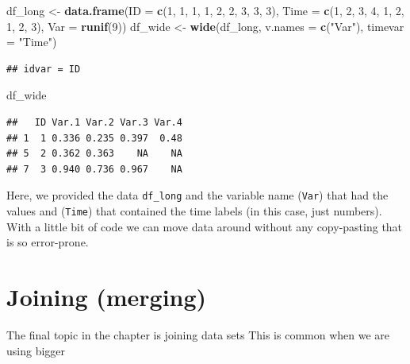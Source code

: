 \documentclass[]{tufte-book}
\newenvironment{Shaded}{}{}
\newcommand{\KeywordTok}[1]{\textcolor[rgb]{0.00,0.44,0.13}{\textbf{#1}}}
\newcommand{\DataTypeTok}[1]{\textcolor[rgb]{0.56,0.13,0.00}{#1}}
\newcommand{\DecValTok}[1]{\textcolor[rgb]{0.25,0.63,0.44}{#1}}
\newcommand{\StringTok}[1]{\textcolor[rgb]{0.25,0.44,0.63}{#1}}
\newcommand{\NormalTok}[1]{#1}
\theoremstyle{definition}
\theoremstyle{definition}
\theoremstyle{remark}
\begin{document}
\begin{Shaded}
\begin{Highlighting}[]
\NormalTok{df_long <-}\StringTok{ }\KeywordTok{data.frame}\NormalTok{(}\DataTypeTok{ID =} \KeywordTok{c}\NormalTok{(}\DecValTok{1}\NormalTok{, }\DecValTok{1}\NormalTok{, }\DecValTok{1}\NormalTok{, }\DecValTok{1}\NormalTok{, }\DecValTok{2}\NormalTok{, }\DecValTok{2}\NormalTok{, }
    \DecValTok{3}\NormalTok{, }\DecValTok{3}\NormalTok{, }\DecValTok{3}\NormalTok{), }\DataTypeTok{Time =} \KeywordTok{c}\NormalTok{(}\DecValTok{1}\NormalTok{, }\DecValTok{2}\NormalTok{, }\DecValTok{3}\NormalTok{, }\DecValTok{4}\NormalTok{, }\DecValTok{1}\NormalTok{, }\DecValTok{2}\NormalTok{, }\DecValTok{1}\NormalTok{, }\DecValTok{2}\NormalTok{, }
    \DecValTok{3}\NormalTok{), }\DataTypeTok{Var =} \KeywordTok{runif}\NormalTok{(}\DecValTok{9}\NormalTok{))}
\NormalTok{df_wide <-}\StringTok{ }\KeywordTok{wide}\NormalTok{(df_long, }\DataTypeTok{v.names =} \KeywordTok{c}\NormalTok{(}\StringTok{"Var"}\NormalTok{), }\DataTypeTok{timevar =} \StringTok{"Time"}\NormalTok{)}
\end{Highlighting}
\end{Shaded}

\begin{verbatim}
## idvar = ID
\end{verbatim}

\begin{Shaded}
\begin{Highlighting}[]
\NormalTok{df_wide}
\end{Highlighting}
\end{Shaded}

\begin{verbatim}
##   ID Var.1 Var.2 Var.3 Var.4
## 1  1 0.336 0.235 0.397  0.48
## 5  2 0.362 0.363    NA    NA
## 7  3 0.940 0.736 0.967    NA
\end{verbatim}

Here, we provided the data \texttt{df\_long} and the variable name
(\texttt{Var}) that had the values and (\texttt{Time}) that contained
the time labels (in this case, just numbers). With a little bit of code
we can move data around without any copy-pasting that is so error-prone.

\section*{Joining (merging)}\label{joining-merging}

The final topic in the chapter is joining data sets This is common when
we are using bigger
\end{document}
